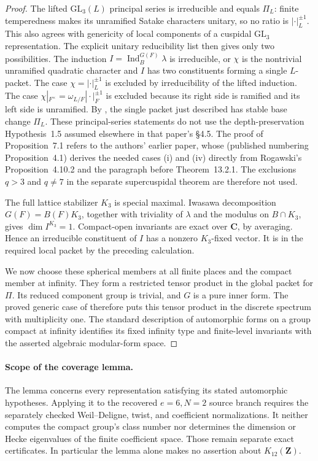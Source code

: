 \begin{proof}
The lifted $\mathrm{GL}_3(L)$ principal series is irreducible and equals
$\Pi_L$: finite temperedness makes its unramified Satake characters
unitary, so no ratio is $|\cdot|_L^{\pm1}$. This also agrees with
genericity of local components of a cuspidal $\mathrm{GL}_3$ representation.
The explicit unitary reducibility list
\cite[\S4.4, pp.~14--15]{K17AdlerLansky2010}
then gives only two possibilities. The induction
$I=\operatorname{Ind}_B^{G(F)}\lambda$ is irreducible, or $\chi$ is the
nontrivial unramified quadratic character and $I$ has two constituents
forming a single $L$-packet. The case $\chi=|\cdot|_L^{\pm1}$ is
excluded by irreducibility of the lifted induction. The case
$\chi|_{F^\times}=\omega_{L/F}|\cdot|_F^{\pm1}$ is excluded because
its right side is ramified and its left side is unramified.
By \cite[Proposition~6.1(1),(4), p.~21, and
Proposition~7.1(i),(iv), p.~28]{K17AdlerLansky2010}, the single packet
just described has stable base change $\Pi_L$.
These principal-series statements do not use the depth-preservation
Hypothesis~1.5 assumed elsewhere in that paper's \S4.5. The proof of
Proposition~7.1 refers to the authors' earlier paper, whose
\cite[Proposition~5.1 and complete proof, pp.~19--20]{K17AdlerLanskyUnram}
(published numbering Proposition~4.1) derives the needed cases (i) and (iv)
directly from Rogawski's Proposition~4.10.2 and the paragraph before
Theorem~13.2.1. The exclusions $q>3$ and $q\ne7$ in the separate
supercuspidal theorem are therefore not used.

The full lattice stabilizer $K_3$ is special maximal. Iwasawa decomposition
$G(F)=B(F)K_3$, together with triviality of $\lambda$ and the modulus on
$B\cap K_3$, gives $\dim I^{K_3}=1$. Compact-open invariants are exact
over $\mathbf C$, by averaging. Hence an irreducible constituent of $I$
has a nonzero $K_3$-fixed vector. It is in the required local packet by the
preceding calculation.

We now choose these spherical members at all finite places and the compact
member at infinity. They form a restricted tensor product in the global
packet for $\Pi$. Its reduced component group is trivial, and $G$ is a
pure inner form. The proved generic case of
\cite[Theorem~5.0.5]{K17KMSW2014} therefore puts this tensor product in
the discrete spectrum with multiplicity one. The standard description of
automorphic forms on a group compact at infinity identifies its fixed
infinity type and finite-level invariants with the asserted algebraic
modular-form space.
\end{proof}

\paragraph{Scope of the coverage lemma.}
The lemma concerns every representation satisfying its stated automorphic
hypotheses. Applying it to the recovered $e=6,N=2$ source branch requires
the separately checked Weil--Deligne, twist, and coefficient normalizations.
It neither computes the compact group's class number nor determines the
dimension or Hecke eigenvalues of the finite coefficient space. Those
remain separate exact certificates. In particular the lemma alone makes
no assertion about $K_{12}(\mathbf Z)$.

